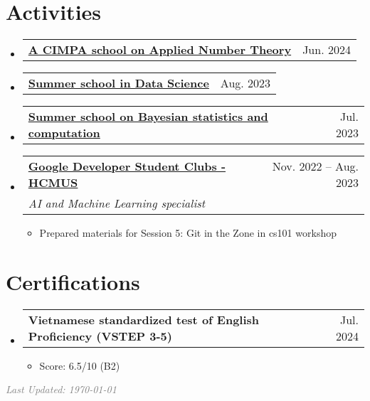 \documentclass[letterpaper,11pt]{article}
\makeatletter
\newcommand{\heading}[4]{
    \normalsize
    \begin{tabular*}{0.97\textwidth}[t]{l@{\extracolsep{\fill}}r}
      \textbf{#1} & #2 \\[-2pt]
      \textit{\small#3} & \textit{\small #4}
    \end{tabular*}
    \vspace{-2pt}
}
\newcommand{\subheading}[2]{
    \normalsize
    \begin{tabular*}{0.97\textwidth}[t]{l@{\extracolsep{\fill}}r}
      \textbf{#1} & #2 \\
    \end{tabular*}
    \vspace{-2pt}
}
\makeatother
\begin{document}
\section{Activities}
\begin{itemize}
    \item \subheading{\href{http://www.rnta.eu/HCMC2024/index.html}{A CIMPA school on Applied Number Theory \faExternalLink}}{Jun. 2024}

    \item \subheading{\href{https://viasm.edu.vn/hdkh/ssds2023}{Summer school in Data Science \faExternalLink}}{Aug. 2023}
    
    \item \subheading{\href{https://viasm.edu.vn/hdkh/somsaml}{Summer school on Bayesian statistics and computation \faExternalLink}}{Jul. 2023}

    \item \heading{\href{https://www.facebook.com/gdgoc.hcmus}{Google Developer Student Clubs - HCMUS \faExternalLink}}{Nov. 2022 -- Aug. 2023}{AI and Machine Learning specialist}{}
        \begin{itemize}
            \item Prepared materials for Session 5: Git in the Zone in cs101 workshop
        \end{itemize}

\end{itemize}



\section{Certifications}
\begin{itemize}
    
    \item \subheading{Vietnamese standardized test of English Proficiency (VSTEP 3-5) }{Jul. 2024}
        \begin{itemize}
            \item Score: 6.5/10 (B2)
        \end{itemize}
    
    

\end{itemize}



\vfill
    \hfill\textcolor{gray}{\textit{Last Updated: \today}}
\end{document}
